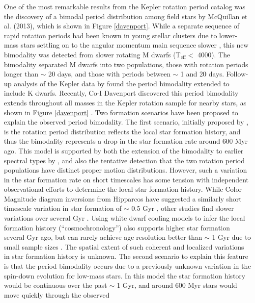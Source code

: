 \documentclass[useAMS, usenatbib, preprint, 12pt]{aastex}
\newcommand{\eg}{{\it e.g.}}
\begin{document}
One of the most remarkable results from the Kepler rotation period catalog was
the discovery of a bimodal period distribution among field stars by McQuillan
et al. (2013), which is shown
in Figure \ref{davenport}.
While a separate sequence of rapid rotation periods had been known in young
stellar clusters due to lower-mass stars settling on to the angular momentum
main sequence slower \citep[\eg][]{barnes2007}, this new bimodality was
detected from slower rotating M dwarfs (T$_\mathrm{eff} <$ 4000).
The bimodality separated M dwarfs into two populations, those with rotation
periods longer than $\sim$ 20 days, and those with periods between $\sim$ 1
and 20 days.
Follow-up analysis of the Kepler data by \citet{mcquillan2014} found the
period bimodality extended to include K dwarfs.
Recently, Co-I Davenport discovered this period bimodality extends throughout
all masses in the Kepler rotation sample for nearby stars, as shown in Figure
\ref{davenport} \citep{davenport2017}.
Two formation scenarios have been proposed to explain the observed period
bimodality.
The first scenario, initially proposed by \citet{mcquillan2013}, is the
rotation period distribution reflects the local star formation history, and
thus the bimodality represents a drop in the star formation rate around 600
Myr ago.
This model is supported by both the extension of the bimodality to earlier
spectral types by \citet{davenport2017}, and also the tentative detection that
the two rotation period populations have distinct proper motion distributions.
However, such a variation in the star formation rate on short timescales has
some tension with independent observational efforts to determine the local
star formation history.
While Color–Magnitude diagram inversions from Hipparcos have suggested a
similarly short timescale variation in star formation of $\sim$ 0.5 Gyr
\citep{hernandez2000}, other studies find slower variations over several
Gyr \citep[\eg][]{cignoni2006}.
Using white dwarf cooling models to infer the local formation history
(“cosmochronology”) also supports higher star formation several Gyr ago, but
can rarely achieve age resolution better than $\sim$ 1 Gyr due to small sample
sizes \citep{tremblay2014}.
The spatial extent of such coherent and localized variations in star formation
history is unknown.
The second scenario to explain this feature is that the period bimodality
occurs due to a previously unknown variation in the spin-down evolution for
low-mass stars.
In this model the star formation history would be continuous over the past
$\sim$ 1 Gyr, and around 600 Myr stars would move quickly through the observed
\end{document}

